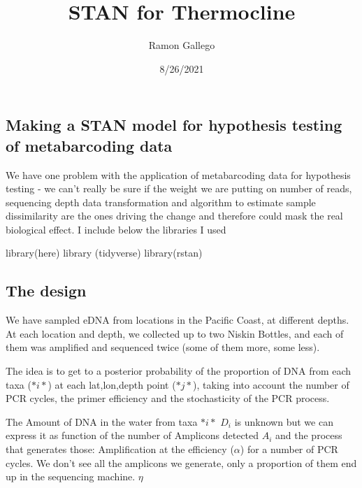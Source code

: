 \documentclass[
]{article}
\title{STAN for Thermocline}
\author{Ramon Gallego}
\date{8/26/2021}
\newenvironment{Shaded}{\begin{snugshade}}{\end{snugshade}}
\newcommand{\FunctionTok}[1]{\textcolor[rgb]{0.00,0.00,0.00}{#1}}
\newcommand{\NormalTok}[1]{#1}
\begin{document}
\maketitle

\hypertarget{making-a-stan-model-for-hypothesis-testing-of-metabarcoding-data}{%
\subsection{Making a STAN model for hypothesis testing of metabarcoding
data}\label{making-a-stan-model-for-hypothesis-testing-of-metabarcoding-data}}

We have one problem with the application of metabarcoding data for
hypothesis testing - we can't really be sure if the weight we are
putting on number of reads, sequencing depth data transformation and
algorithm to estimate sample dissimilarity are the ones driving the
change and therefore could mask the real biological effect. I include
below the libraries I used

\begin{Shaded}
\begin{Highlighting}[]
\FunctionTok{library}\NormalTok{(here)}
\FunctionTok{library}\NormalTok{ (tidyverse)}
\FunctionTok{library}\NormalTok{(rstan)}
\end{Highlighting}
\end{Shaded}

\hypertarget{the-design}{%
\subsection{The design}\label{the-design}}

We have sampled eDNA from locations in the Pacific Coast, at different
depths. At each location and depth, we collected up to two Niskin
Bottles, and each of them was amplified and sequenced twice (some of
them more, some less).

The idea is to get to a posterior probability of the proportion of DNA
from each taxa (\(*i*\)) at each lat,lon,depth point (\(*j*\)), taking
into account the number of PCR cycles, the primer efficiency and the
stochasticity of the PCR process.

The Amount of DNA in the water from taxa \(*i*\) \(D_i\) is unknown but
we can express it as function of the number of Amplicons detected
\(A_i\) and the process that generates those: Amplification at the
efficiency (\(\alpha\)) for a number of PCR cycles. We don't see all the
amplicons we generate, only a proportion of them end up in the
sequencing machine. \(\eta\)
\end{document}

